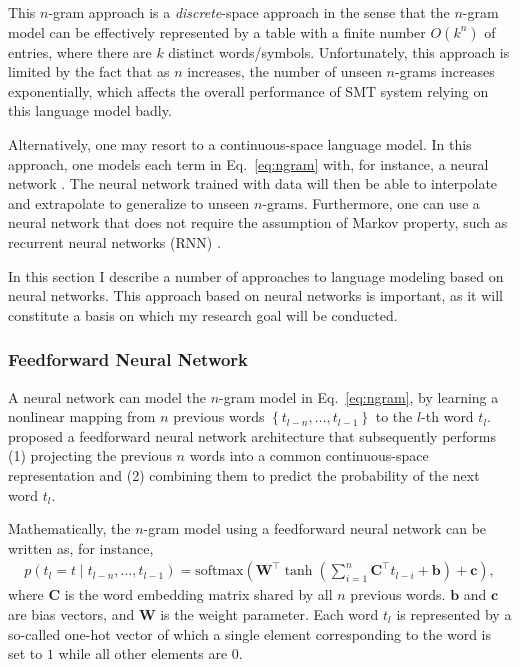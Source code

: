 \documentclass[11pt, oneside]{essay}
\newcommand{\softmax}{\text{softmax}}
\newcommand{\vect}[1]{\mathbf{#1}}
\newcommand{\matr}[1]{\mathbf{#1}}
\newcommand{\vb}[0]{\vect{b}}
\newcommand{\vc}[0]{\vect{c}}
\newcommand{\mW}[0]{\matr{W}}
\newcommand{\mC}{\matr{C}}
\begin{document}
This $n$-gram approach is a \textit{discrete}-space approach in
the sense that the $n$-gram model can be effectively represented
by a table with a finite number $O(k^n)$ of entries, where there
are $k$ distinct words/symbols. Unfortunately, this approach is
limited by the fact that as $n$ increases, the number of unseen
$n$-grams increases exponentially, which affects the overall
performance of SMT system relying on this language model badly. 

Alternatively, one may resort to a continuous-space language
model. In this approach, one models each term in
Eq.~\eqref{eq:ngram} with, for instance, a neural network
\citep{Bengio2003}. The neural network trained with data will
then be able to interpolate and extrapolate to generalize to
unseen $n$-grams. Furthermore, one can use a neural network that
does not require the assumption of Markov property, such as
recurrent neural networks (RNN) \citep{Rumelhart1986,Mikolov2010}. 

In this section I describe a number of approaches to
language modeling based on neural networks. This approach based
on neural networks is important, as it will constitute a basis on
which my research goal will be conducted. 

\subsubsection{Feedforward Neural Network}

A neural network can model the $n$-gram model in
Eq.~\eqref{eq:ngram}, by learning a nonlinear mapping from $n$
previous words $\left\{ t_{l-n}, \dots, t_{l-1} \right\}$ to the
$l$-th word $t_l$. \citet{Bengio2003} proposed a feedforward
neural network architecture that subsequently performs (1)
projecting the previous $n$ words into a common continuous-space
representation and (2) combining them to predict the probability
of the next word $t_l$. 

Mathematically, the $n$-gram model using a feedforward neural
network can be written as, for instance, 
\begin{align}
\label{eq:fflm}
    p(t_l =t \mid t_{l-n}, \dots, t_{l-1}) = \softmax
    \left( \mW^\top \tanh\left(\sum_{i=1}^n \mC^\top t_{l-i} +
    \vb\right) +\vc
    \right),
\end{align}
where $\mC$ is the word embedding matrix shared by all $n$
previous words. $\vb$ and $\vc$ are bias vectors, and $\mW$ is
the weight parameter. Each word $t_l$ is represented by a
so-called one-hot vector of which a single element corresponding
to the word is set to $1$ while all other elements are $0$.
\end{document}
